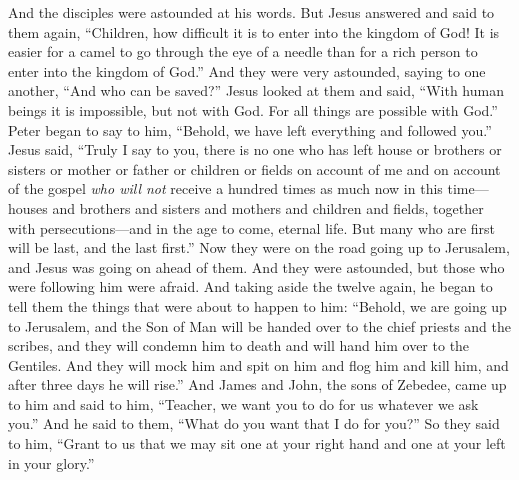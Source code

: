 \begin{biblechapter}
\verse And the disciples were astounded at his words. But Jesus answered and said to them again, “Children, how difficult it is to enter into the kingdom of God!
\verse It is easier for a camel to go through the eye of a needle than for a rich person to enter into the kingdom of God.”
\verse And they were very astounded, saying to one another, “And who can be saved?”
\verse Jesus looked at them and said, “With human beings it is impossible, but not with God. For all things are possible with God.”
\verse Peter began to say to him, “Behold, we have left everything and followed you.”
\verse Jesus said, “Truly I say to you, there is no one who has left house or brothers or sisters or mother or father or children or fields on account of me and on account of the gospel
\verse \textit{who will not} receive a hundred times as much now in this time—houses and brothers and sisters and mothers and children and fields, together with persecutions—and in the age to come, eternal life.
\verse But many who are first will be last, and the last first.”
 Now they were on the road going up to Jerusalem, and Jesus was going on ahead of them. And they were astounded, but those who were following him were afraid. And taking aside the twelve again, he began to tell them the things that were about to happen to him:
\verse “Behold, we are going up to Jerusalem, and the Son of Man will be handed over to the chief priests and the scribes, and they will condemn him to death and will hand him over to the Gentiles.
\verse And they will mock him and spit on him and flog him and kill him, and after three days he will rise.”
 And James and John, the sons of Zebedee, came up to him and said to him, “Teacher, we want you to do for us whatever we ask you.”
\verse And he said to them, “What do you want that I do for you?”
\verse So they said to him, “Grant to us that we may sit one at your right hand and one at your left in your glory.”

\end{biblechapter}
